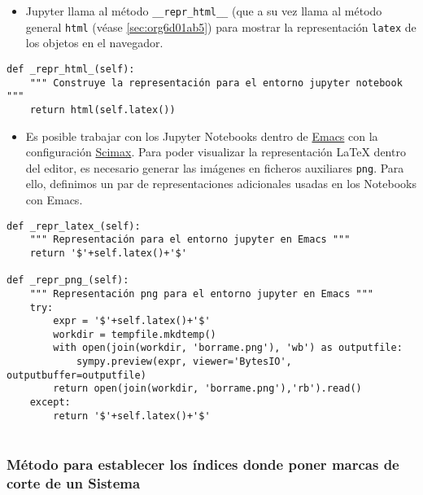 \documentclass[11pt]{report}
\begin{document}
\begin{itemize}
\item Jupyter llama al método \texttt{\_\_repr\_html\_\_} (que a su vez llama al
método general \texttt{html} (véase \ref{sec:org6d01ab5}) para mostrar la representación \texttt{latex} de los
objetos en el navegador.
\end{itemize}

\begin{verbatim}
def _repr_html_(self):
    """ Construye la representación para el entorno jupyter notebook """
    return html(self.latex())

\end{verbatim}

\begin{itemize}
\item Es posible trabajar con los Jupyter Notebooks dentro de \href{https://www.gnu.org/software/emacs/}{Emacs} con la
configuración \href{https://github.com/jkitchin/scimax}{Scimax}. Para poder visualizar la representación
\LaTeX{} dentro del editor, es necesario generar las imágenes en
ficheros auxiliares \texttt{png}. Para ello, definimos un par de
representaciones adicionales usadas en los Notebooks con Emacs.
\end{itemize}

\begin{verbatim}
def _repr_latex_(self):
    """ Representación para el entorno jupyter en Emacs """
    return '$'+self.latex()+'$'

def _repr_png_(self):
    """ Representación png para el entorno jupyter en Emacs """
    try:
        expr = '$'+self.latex()+'$'
        workdir = tempfile.mkdtemp()
        with open(join(workdir, 'borrame.png'), 'wb') as outputfile:
            sympy.preview(expr, viewer='BytesIO', outputbuffer=outputfile)
        return open(join(workdir, 'borrame.png'),'rb').read()
    except:
        return '$'+self.latex()+'$'
                                                               
\end{verbatim}

\subsubsection{Método para establecer los índices donde poner marcas de corte de un Sistema}
\label{sec:org1363836}
\end{document}
